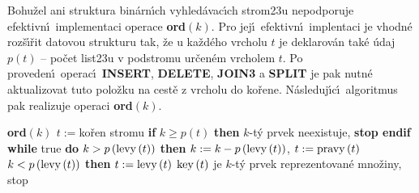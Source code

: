 \flushpar Bohu\v zel ani struktura bin\'arn\'\i ch vyhled\'avac\'\i ch 
strom\accent23u nepodporuje efektivn\'\i\ implementaci operace 
{\bf ord$\left(k\right)$}. Pro jej\'\i\ efektivn\'\i\ implentaci je vhodn\'e roz\v s\'\i\v rit 
datovou strukturu tak, \v ze u ka\v zd\'eho vrcholu $t$ je deklarov\'an 
tak\'e \'udaj $p\left(t\right)$ -- po\v cet list\accent23u v podstromu ur\v cen\'em 
vrcholem $t$. Po proveden\'\i\ operac\'\i\ {\bf INSERT}, {\bf DELETE}, {\bf JOIN3} a 
{\bf SPLIT} je pak nutn\'e aktualizovat tuto polo\v zku na cest\v e z 
vrcholu do ko\v rene. N\'asleduj\'\i c\'\i\ algoritmus pak 
realizuje operaci {\bf ord}$\left(k\right)$.
\medskip

{\bf ord$\left(k\right)$ \newline 
$t:=$}ko\v ren stromu \newline 
{\bf if} $k\ge p\left(t\right)$ {\bf then} $k$-t\'y prvek neexistuje, {\bf stop endif\newline 
while} true {\bf do}\newline 
\phantom{---}{\bf if} $k>p\left(\operatorname{levy}\left(t\right)\right)$ {\bf then}\newline 
\phantom{------}$k:=k-p\left(\operatorname{levy}\left(t\right)\right)$, $t:=\operatorname{pravy}\left(t\right)$\newline 
\phantom{---}{\bf else}\newline 
\phantom{------}{\bf if} $k<p\left(\operatorname{levy}\left(t\right)\right)$ {\bf then}\newline 
\phantom{---------}$t:=\operatorname{levy}\left(t\right)$\newline 
\phantom{------}{\bf else}\newline 
\phantom{---------}$\operatorname{key}\left(t\right)$ je $k$-t\'y prvek reprezentovan\'e mno\v ziny, stop \newline 
\phantom{------}{\bf endif}\newline 
\phantom{---}{\bf endif\newline 
enddo}
\bigskip


